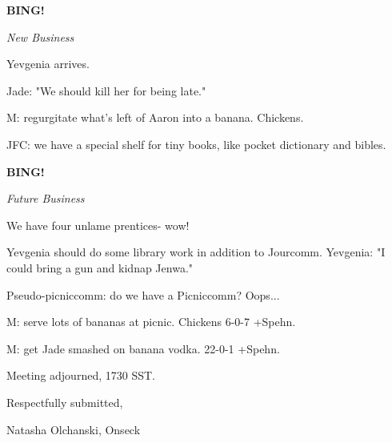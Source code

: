 \documentclass[12pt]{article}
\newcommand{\bing}{{\bf BING!} }
\newcommand{\goto}[1]{\bing \vskip 12pt \centerline{{\em{#1}}}}
\begin{document}
\goto{New Business}

Yevgenia arrives.

Jade: "We should kill her for being late."

M: regurgitate what's left of Aaron into a banana. Chickens.

JFC: we have a special shelf for tiny books, like pocket dictionary and bibles.

\goto{Future Business}

We have four unlame prentices- wow!

Yevgenia should do some library work in addition to Jourcomm. Yevgenia: "I could bring a gun and kidnap Jenwa."

Pseudo-picniccomm: do we have a Picniccomm? Oops...

M: serve lots of bananas at picnic. Chickens 6-0-7 +Spehn.

M: get Jade smashed on banana vodka. 22-0-1 +Spehn.

\vspace{12pt}

\noindent
Meeting adjourned, 1730 SST.

\vspace{18pt}

\centerline{Respectfully submitted,}
\centerline{Natasha Olchanski, Onseck}
\end{document}
